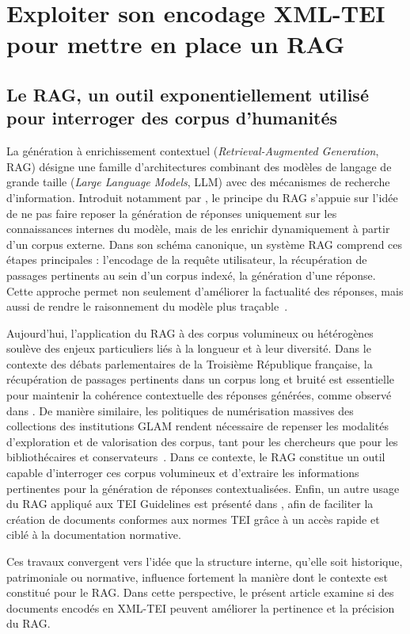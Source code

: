 \documentclass[final, fra]{anthology-ch}     %
\begin{document}
\section{Exploiter son encodage XML-TEI pour mettre en place un RAG}
\subsection{Le RAG, un outil exponentiellement utilisé pour interroger des corpus d’humanités}
La génération à enrichissement contextuel (\textit{Retrieval-Augmented Generation}, RAG) désigne une famille d’architectures combinant des modèles de langage de grande taille (\textit{Large Language Models}, LLM) avec des mécanismes de recherche d’information. Introduit notamment par \cite{lewis_rag_2021}, le principe du RAG s’appuie sur l’idée de ne pas faire reposer la génération de réponses uniquement sur les connaissances internes du modèle, mais de les enrichir dynamiquement à partir d’un corpus externe. Dans son schéma canonique, un système RAG comprend ces étapes principales : l’encodage de la requête utilisateur, la récupération de passages pertinents au sein d’un corpus indexé, la génération d’une réponse. Cette approche permet non seulement d’améliorer la factualité des réponses, mais aussi de rendre le raisonnement du modèle plus traçable~\cite{lewis_rag_2021}. 

Aujourd’hui, l’application du RAG à des corpus volumineux ou hétérogènes soulève des enjeux particuliers liés à la longueur et à leur diversité. Dans le contexte des débats parlementaires de la Troisième République française, la récupération de passages pertinents dans un corpus long et bruité est essentielle pour maintenir la cohérence contextuelle des réponses générées, comme observé dans \cite{perez_evaluation_2025}. De manière similaire, les politiques de numérisation massives des collections des institutions GLAM rendent nécessaire de repenser les modalités d’exploration et de valorisation des corpus, tant pour les chercheurs que pour les bibliothécaires et conservateurs~\cite{faci_rag_2024}. Dans ce contexte, le RAG constitue un outil capable d’interroger ces corpus volumineux et d’extraire les informations pertinentes pour la génération de réponses contextualisées. Enfin, un autre usage du RAG appliqué aux TEI Guidelines est présenté dans \cite{khemakhem_tei_rag_2024}, afin de faciliter la création de documents conformes aux normes TEI grâce à un accès rapide et ciblé à la documentation normative.

Ces travaux convergent vers l’idée que la structure interne, qu’elle soit historique, patrimoniale ou normative, influence fortement la manière dont le contexte est constitué pour le RAG. Dans cette perspective, le présent article examine si des documents encodés en XML-TEI peuvent améliorer la pertinence et la précision du RAG.
\end{document}
